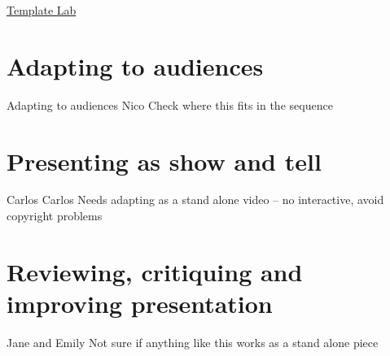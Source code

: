 \documentclass[
]{book}
\begin{document}
\href{https://templatelab.com/research-posters/}{Template Lab}

\hypertarget{audience}{%
\chapter{Adapting to audiences}\label{audience}}

Adapting to audiences Nico Check where this fits in the sequence

\hypertarget{show}{%
\chapter{Presenting as show and tell}\label{show}}

Carlos Carlos Needs adapting as a stand alone video -- no interactive, avoid copyright problems

\hypertarget{review}{%
\chapter{Reviewing, critiquing and improving presentation}\label{review}}

Jane and Emily Not sure if anything like this works as a stand alone piece

  
\end{document}
